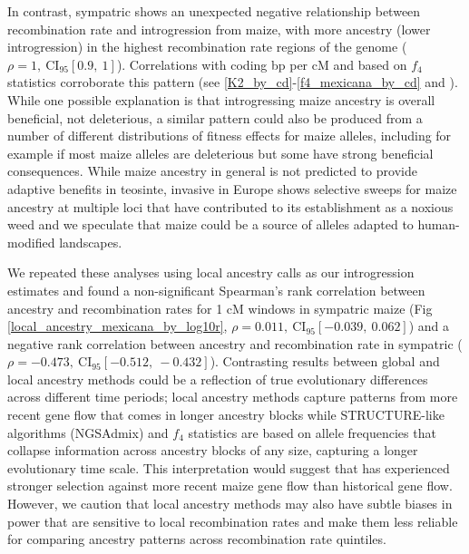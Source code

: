 In contrast, sympatric \mexicana shows an unexpected negative relationship between recombination rate and introgression from maize, with more \mexicana ancestry (lower introgression) in the highest recombination rate regions of the genome ($\rho = 1,\ \text{CI}_{95}[0.9,\ 1]$). Correlations with coding bp per cM and based on $f_4$ statistics corroborate this pattern (see \ref{K2_by_cd}-\ref{f4_mexicana_by_cd} and ). 
While one possible explanation is that introgressing maize ancestry is overall beneficial, not deleterious, a similar pattern could also be produced from a number of different distributions of fitness effects for maize alleles, including for example if most maize alleles are deleterious but some have strong beneficial consequences.
While maize ancestry in general is not predicted to provide adaptive benefits in teosinte, invasive \mexicana in Europe shows selective sweeps for maize ancestry at multiple loci that have contributed to its establishment as a noxious weed \cite{Le_Corre:2020} and we speculate that maize could be a source of alleles adapted to human-modified landscapes.

We repeated these analyses using local ancestry calls as our introgression estimates and found a non-significant Spearman's rank correlation between \mexicana ancestry and recombination rates for 1 cM windows in sympatric maize (Fig \ref{local_ancestry_mexicana_by_log10r}, $\rho = 0.011,\ \text{CI}_{95}[-0.039,\ 0.062]$) and a negative rank correlation between \mexicana ancestry and recombination rate in sympatric \mexicana ($\rho = -0.473,\ \text{CI}_{95}[-0.512,\ -0.432]$).
Contrasting results between global and local ancestry methods could be a reflection of true evolutionary differences across different time periods; local ancestry methods capture patterns from more recent gene flow that comes in longer ancestry blocks while STRUCTURE-like algorithms (NGSAdmix) and $f_4$ statistics are based on allele frequencies that collapse information across ancestry blocks of any size, capturing a longer evolutionary time scale.
This interpretation would suggest that \mexicana has experienced stronger selection against more recent maize gene flow than historical gene flow. 
However, we caution that local ancestry methods may also have subtle biases in power that are sensitive to local recombination rates and make them less reliable for comparing ancestry patterns across recombination rate quintiles.

